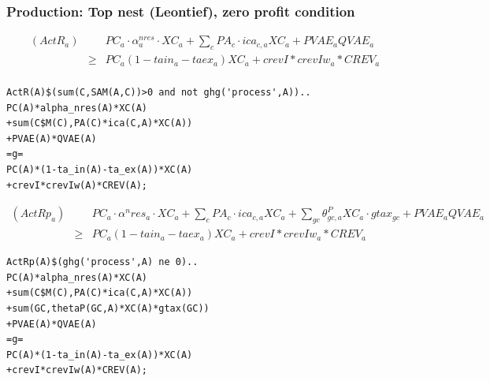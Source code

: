 \documentclass[10pt,compress,slidetop,%
			   hyperref={unicode},xcolor={svgnames},%
			   t]{beamer}
\begin{document}
\begin{frame}[fragile]
\frametitle{Production: Top nest (Leontief), zero profit condition}
\begin{scriptsize}

\begin{eqnarray*}
(ActR_a)& &PC_a\cdot\alpha^{nres}_a\cdot XC_a +\sum_c PA_c\cdot ica_{c,a}XC_a+PVAE_aQVAE_a\\
&\ge& PC_a(1-tain_a-taex_a)XC_a +crevI*crevIw_a*CREV_a\\
\end{eqnarray*}
\begin{verbatim}
ActR(A)$(sum(C,SAM(A,C))>0 and not ghg('process',A))..
PC(A)*alpha_nres(A)*XC(A)
+sum(C$M(C),PA(C)*ica(C,A)*XC(A))
+PVAE(A)*QVAE(A)
=g=
PC(A)*(1-ta_in(A)-ta_ex(A))*XC(A)
+crevI*crevIw(A)*CREV(A);
\end{verbatim}


\begin{eqnarray*}
(ActRp_a)& &PC_a\cdot\alpha^nres_a\cdot XC_a +\sum_c PA_c\cdot ica_{c,a}XC_a+\sum_{gc}\theta^P_{gc,a}XC_a\cdot gtax_{gc}+PVAE_aQVAE_a\\
&\ge& PC_a(1-tain_a-taex_a)XC_a +crevI*crevIw_a*CREV_a
\end{eqnarray*}
\begin{verbatim}
ActRp(A)$(ghg('process',A) ne 0)..
PC(A)*alpha_nres(A)*XC(A)
+sum(C$M(C),PA(C)*ica(C,A)*XC(A))
+sum(GC,thetaP(GC,A)*XC(A)*gtax(GC))
+PVAE(A)*QVAE(A)
=g=
PC(A)*(1-ta_in(A)-ta_ex(A))*XC(A)
+crevI*crevIw(A)*CREV(A);
\end{verbatim}
\end{scriptsize}
\end{frame}
\end{document}
